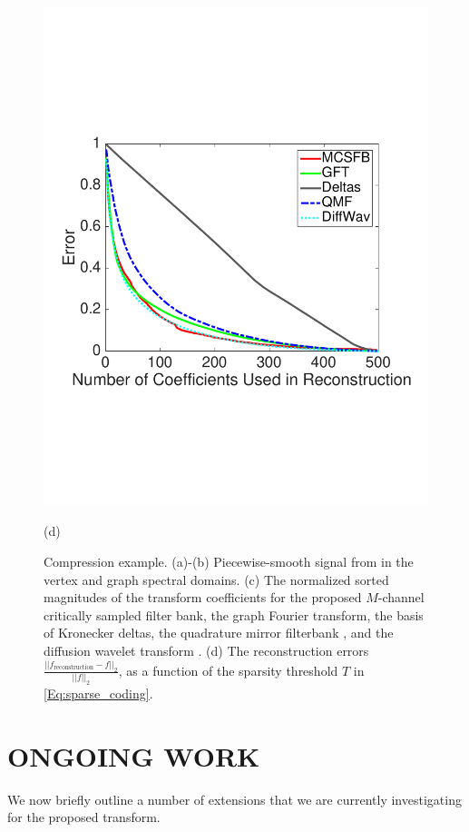 \documentclass{article}
\begin{document}
\begin{figure}[tbh]
\begin{minipage}[m]{0.48\linewidth}
\centerline{\includegraphics[width=.98\linewidth]{fig_comp_error}}
\centerline{\small{(d)}}
\end{minipage}
\caption{Compression example. (a)-(b) Piecewise-smooth signal from \cite[Fig. 11]{shuman_TSP_multiscale} in the vertex and graph spectral domains. (c) The normalized sorted magnitudes of the transform coefficients for the proposed $M$-channel critically sampled filter bank, the graph Fourier transform, the basis of Kronecker deltas, the quadrature mirror filterbank \cite{narang2012perfect}, and the diffusion wavelet transform \cite{coifman2006diffusion}. (d) The reconstruction errors  $\frac{\left|\left|f_{\mbox{reconstruction}}-f\right|\right|_2}{||f||_2}$, as a function of the sparsity threshold $T$ in \eqref{Eq:sparse_coding}.} \label{Fig:comp}
\end{figure}

\section{ONGOING WORK}
\label{Sec:ongoing}
We now briefly outline a number of extensions that we are currently investigating for the proposed transform.
\end{document}
